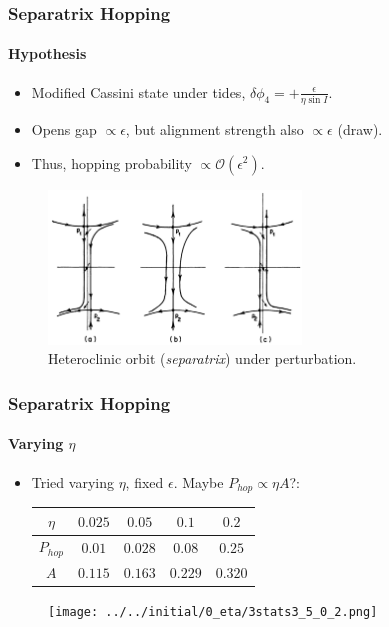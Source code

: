 \documentclass[dvipsnames]{beamer}
\begin{document}
\begin{frame}
    \frametitle{Separatrix Hopping}
    \framesubtitle{Hypothesis}

    \begin{itemize}
        \item Modified Cassini state under tides, $\delta \phi_4 =
            +\frac{\epsilon}{\eta \sin I}$.

        \item Opens gap $\propto \epsilon$, but alignment strength also $\propto
            \epsilon$ (draw).

        \item Thus, hopping probability $\propto \mathcal{O}(\epsilon^2)$.
    \end{itemize}
    \begin{figure}[t]
        \centering
        \includegraphics[width=0.6\textwidth]{../plots/heteroclinic.png}
        \caption{Heteroclinic orbit (\emph{separatrix}) under perturbation.}
    \end{figure}
\end{frame}

\begin{frame}
    \frametitle{Separatrix Hopping}
    \framesubtitle{Varying $\eta$}

    \begin{itemize}
        \item Tried varying $\eta$, fixed $\epsilon$. Maybe $P_{hop} \propto
            \eta A$?:
            \begin{table}[t]
                \centering
                \begin{tabular}{c | c c c c}
                    $\eta$ & $0.025$ & $0.05$ & $0.1$ & $0.2$\\\midrule
                    $P_{hop}$ & $0.01$ & $0.028$ & $0.08$ & $0.25$\\\midrule
                    $A$ & $0.115$ & $0.163$ & $0.229$ & $0.320$
                \end{tabular}
            \end{table}
    \end{itemize}
    \begin{figure}[b]
        \centering
        \texttt{[image: ../../initial/0\_eta/3stats3\_5\_0\_2.png]}
    \end{figure}
\end{frame}
\end{document}
